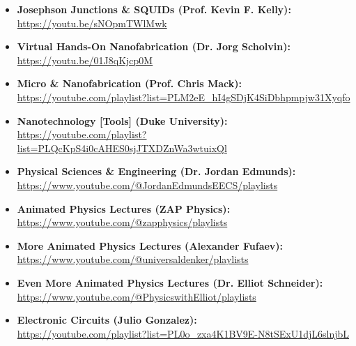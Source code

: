 \begin{itemize}
  \item\textbf{Josephson Junctions \& SQUIDs (Prof. Kevin F. Kelly):}\\
\url{https://youtu.be/sNOpmTWlMwk}

  \item\textbf{Virtual Hands-On Nanofabrication (Dr. Jorg Scholvin):}\\
\url{https://youtu.be/01J8qKjcp0M}

  \item\textbf{Micro \& Nanofabrication (Prof. Chris Mack):}\\
\url{https://youtube.com/playlist?list=PLM2eE_hI4gSDjK4SiDbhpmpjw31Xyqfo}\\

  \item\textbf{Nanotechnology [Tools] (Duke University):}\\
\url{https://youtube.com/playlist?list=PLQcKpS4i0cAHES0sjJTXDZnWa3wtuixQl}\\

  \item\textbf{Physical Sciences \& Engineering (Dr. Jordan Edmunds):}\\
\url{https://www.youtube.com/@JordanEdmundsEECS/playlists}\\

  \item\textbf{Animated Physics Lectures (ZAP Physics):}\\
\url{https://www.youtube.com/@zapphysics/playlists}\\

  \item\textbf{More Animated Physics Lectures (Alexander Fufaev):}\\
\url{https://www.youtube.com/@universaldenker/playlists}\\

  \item\textbf{Even More Animated Physics Lectures (Dr. Elliot Schneider):}\\
\url{https://www.youtube.com/@PhysicswithElliot/playlists}\\

  \item\textbf{Electronic Circuits (Julio Gonzalez):}\\
\url{https://youtube.com/playlist?list=PL0o_zxa4K1BV9E-N8tSExU1djL6slnjbL}\\

\end{itemize}
